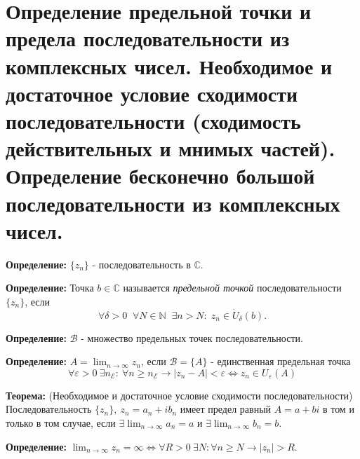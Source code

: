 \section{Определение предельной точки и предела последовательности из
комплексных чисел. Необходимое и достаточное условие сходимости
последовательности (сходимость действительных и мнимых частей).
Определение бесконечно большой последовательности из комплексных
чисел.}\label{ux43eux43fux440ux435ux434ux435ux43bux435ux43dux438ux435-ux43fux440ux435ux434ux435ux43bux44cux43dux43eux439-ux442ux43eux447ux43aux438-ux438-ux43fux440ux435ux434ux435ux43bux430-ux43fux43eux441ux43bux435ux434ux43eux432ux430ux442ux435ux43bux44cux43dux43eux441ux442ux438-ux438ux437-ux43aux43eux43cux43fux43bux435ux43aux441ux43dux44bux445-ux447ux438ux441ux435ux43b.-ux43dux435ux43eux431ux445ux43eux434ux438ux43cux43eux435-ux438-ux434ux43eux441ux442ux430ux442ux43eux447ux43dux43eux435-ux443ux441ux43bux43eux432ux438ux435-ux441ux445ux43eux434ux438ux43cux43eux441ux442ux438-ux43fux43eux441ux43bux435ux434ux43eux432ux430ux442ux435ux43bux44cux43dux43eux441ux442ux438-ux441ux445ux43eux434ux438ux43cux43eux441ux442ux44c-ux434ux435ux439ux441ux442ux432ux438ux442ux435ux43bux44cux43dux44bux445-ux438-ux43cux43dux438ux43cux44bux445-ux447ux430ux441ux442ux435ux439.-ux43eux43fux440ux435ux434ux435ux43bux435ux43dux438ux435-ux431ux435ux441ux43aux43eux43dux435ux447ux43dux43e-ux431ux43eux43bux44cux448ux43eux439-ux43fux43eux441ux43bux435ux434ux43eux432ux430ux442ux435ux43bux44cux43dux43eux441ux442ux438-ux438ux437-ux43aux43eux43cux43fux43bux435ux43aux441ux43dux44bux445-ux447ux438ux441ux435ux43b.}

\textbf{Определение:} \(\{ z_{n} \}\) - последовательность в
\(\mathbb{C}\).

\textbf{Определение:} Точка \(b \in \mathbb{C}\) называется
\emph{предельной точкой} последовательности \(\{z_n\}\), если
\[\forall \delta > 0 \;\; \forall N \in \mathbb{N} \;\; \exists n > N: \; z_n \in \dot{U}_\delta(b).\]

\textbf{Определение:} \(\mathcal{B}\) - множество предельных точек
последовательности.

\textbf{Определение:} \(A=\lim_{ n \to \infty }z_{n}\), если
\(\mathcal{B}=\{ A \}\) - единственная предельная точка \[
\forall\varepsilon>0 \ \exists n_{\mathcal{E}}: \ \forall n\geq n_{\mathcal{E}} \to |z_{n}-A|<\varepsilon\Leftrightarrow  z_{n}\in U_{\varepsilon}(A)
\]

\textbf{Теорема:} (Необходимое и достаточное условие сходимости
последовательности) Последовательность
\(\{ z_{n} \}, \ z_{n}=a_{n}+ib_{n}\) имеет предел равный \(A=a+bi\) в
том и только в том случае, если \(\exists \lim_{ n \to \infty }a_{n}=a\)
и \(\exists \lim_{ n \to \infty }b_{n}=b\).

\textbf{Определение:}
\(\lim_{ n \to \infty }z_{n}=\infty\Leftrightarrow\forall R>0 \ \exists N: \forall n\geq N\to |z_{n}|>R\).
